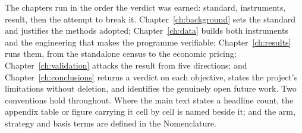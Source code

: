 The chapters run in the order the verdict was earned: standard, instruments, result, then the attempt to break it. Chapter~\ref{ch:background} sets the standard and justifies the methods adopted; Chapter~\ref{ch:data} builds both instruments and the engineering that makes the programme verifiable; Chapter~\ref{ch:results} runs them, from the standalone census to the economic pricing; Chapter~\ref{ch:validation} attacks the result from five directions; and Chapter~\ref{ch:conclusions} returns a verdict on each objective, states the project's limitations without deletion, and identifies the genuinely open future work. Two conventions hold throughout. Where the main text states a headline count, the appendix table or figure carrying it cell by cell is named beside it; and the arm, strategy and basis terms are defined in the Nomenclature.
